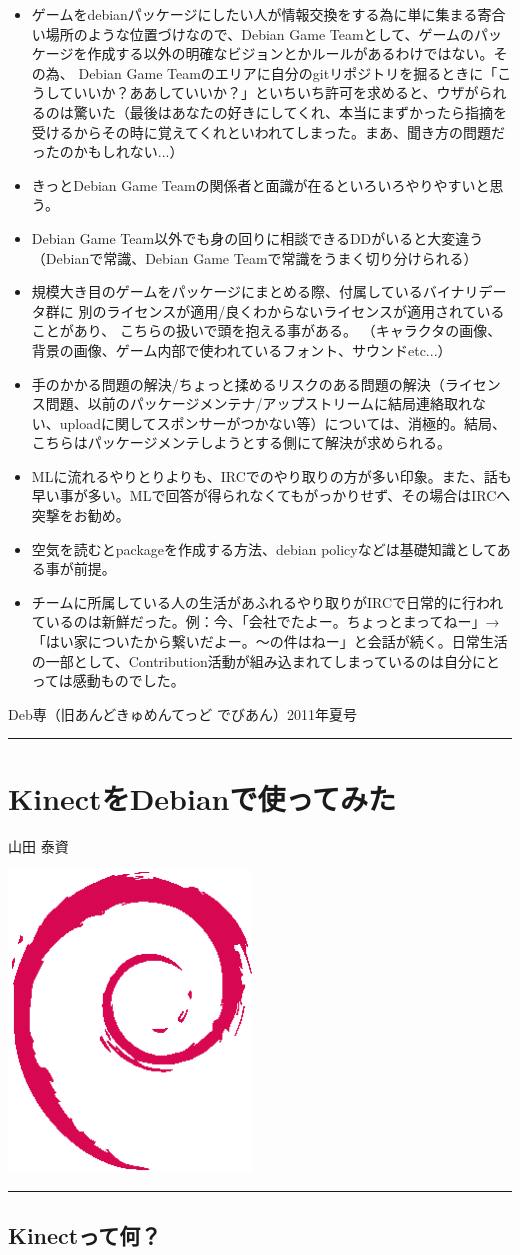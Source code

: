 \documentclass[mingoth,a4paper]{jsarticle}
\renewcommand{\dancersection}[2]{%
\newpage
Deb専（旧あんどきゅめんてっど でびあん）2011年夏号
%
\vspace{0.1mm}\\
{\color{dancerdarkblue}\rule{\hsize}{2mm}}

%
%
\begin{minipage}[t]{0.6\hsize}
\color{dancerdarkblue}
\vspace{1cm}
\section{#1}
\hfill{}#2\\
\end{minipage}
\begin{minipage}[t]{0.4\hsize}
\vspace{-2cm}
\hfill{}\includegraphics[height=8cm]{image200502/openlogo-nd.eps}\\
\vspace{-5cm}
\end{minipage}
%
{\color{dancerlightblue}\rule{0.66\hsize}{2mm}}
%
\vspace{2cm}
}
\begin{document}
 \begin{itemize}
 \item ゲームをdebianパッケージにしたい人が情報交換をする為に単に集まる寄合い場所のような位置づけなので、Debian Game Teamとして、ゲームのパッケージを作成する以外の明確なビジョンとかルールがあるわけではない。その為、 Debian Game Teamのエリアに自分のgitリポジトリを掘るときに「こうしていいか？ああしていいか？」といちいち許可を求めると、ウザがられるのは驚いた（最後はあなたの好きにしてくれ、本当にまずかったら指摘を受けるからその時に覚えてくれといわれてしまった。まあ、聞き方の問題だったのかもしれない...）
   \item きっとDebian Game Teamの関係者と面識が在るといろいろやりやすいと思う。
   \item Debian Game Team以外でも身の回りに相談できるDDがいると大変違う（Debianで常識、Debian Game Teamで常識をうまく切り分けられる）
   \item 規模大き目のゲームをパッケージにまとめる際、付属しているバイナリデータ群に
        別のライセンスが適用/良くわからないライセンスが適用されていることがあり、
         こちらの扱いで頭を抱える事がある。
        （キャラクタの画像、背景の画像、ゲーム内部で使われているフォント、サウンドetc...）
   \item 手のかかる問題の解決/ちょっと揉めるリスクのある問題の解決（ライセンス問題、以前のパッケージメンテナ/アップストリームに結局連絡取れない、uploadに関してスポンサーがつかない等）については、消極的。結局、こちらはパッケージメンテしようとする側にて解決が求められる。
   \item MLに流れるやりとりよりも、IRCでのやり取りの方が多い印象。また、話も早い事が多い。MLで回答が得られなくてもがっかりせず、その場合はIRCへ突撃をお勧め。
   \item 空気を読むとpackageを作成する方法、debian policyなどは基礎知識としてある事が前提。
   \item チームに所属している人の生活があふれるやり取りがIRCで日常的に行われているのは新鮮だった。例：今、「会社でたよー。ちょっとまってねー」→ 「はい家についたから繋いだよー。〜の件はねー」と会話が続く。日常生活の一部として、Contribution活動が組み込まれてしまっているのは自分にとっては感動ものでした。
 \end{itemize}

\dancersection{KinectをDebianで使ってみた}{山田 泰資}

\subsection{Kinectって何？}
\end{document}
